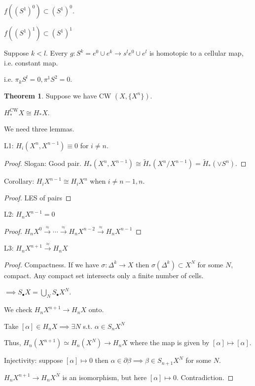 \documentclass{article}
\theoremstyle{definition}
\newtheorem{theorem}{Theorem}
\begin{document}
    \(f((S^1)^0) \subset (S^1)^0\).

    \(f((S^1)^1) \subset (S^1)^1\)

    Suppose \(k < l\). Every \(g: S^k = e^0 \cup e^k \to s^l e^0 \cup e^l\) is homotopic to a cellular map, i.e. constant map.

    i.e. \(\pi_k S^l = 0, \pi^1 S^2 = 0\).

    \begin{theorem}

        Suppose we have CW \((X,\{ X^n \})\).

        \(H_{\ast}^{\text{CW}} X \cong H_{\ast} X\). 
    \end{theorem}

    We need three lemmas.

    L1: \(H_i(X^n, X^{n-1}) \equiv  0\) for \(i\neq n\).
    
    \begin{proof}
        Slogan: Good pair. \(H_{\ast}(X^n, X^{n-1}) \cong \widetilde{H}_{\ast} (X^n / X^{n-1}) = \widetilde{H}_{\ast} (\vee S^n)\). 
    \end{proof}

    Corollary: \(H_i X^{n-1} \cong H_i X^n\) when \(i\neq n-1, n\).
    
    \begin{proof}
        LES of pairs
    \end{proof}

    L2: \(H_n X^{n-1} = 0\)
    
    \begin{proof}
        \(H_n X^0 \xrightarrow{\approx} \cdots \xrightarrow{\approx} H_n X^{n-2} \xrightarrow{\approx} H_n X^{n-1}\) 
    \end{proof}

    L3: \(H_n X^{n+1} \xrightarrow{\approx} H_n X\) 

    \begin{proof}
        Compactness. If we have \(\sigma : \Delta^k \to X\) then \(\sigma(\Delta^k) \subset X^N\) for some \(N\), compact. Any compact set intersects only a finite number of cells.

        \(\implies S_\bullet X = \bigcup_N S_\bullet X^N\).

        We check \(H_n X^{n+1} \to H_n X\) onto.

        Take \([\alpha] \in H_n X \implies \exists N\) s.t. \(\alpha \in S_n X^N\)

        Thus, \(H_n (X^{n+1}) \simeq H_n (X^N) \to H_n X\) where the map is given by \([\alpha] \mapsto [\alpha]\).

        Injectivity: suppose \([\alpha] \mapsto 0\) then \(\alpha \in \partial \beta \implies \beta \in S_{n+1} X^N\) for some \(N\).

        \(H_n X^{n+1} \to H_n X^N\) is an isomorphism, but here \([\alpha] \mapsto 0\). Contradiction.
    \end{proof}
\end{document}
